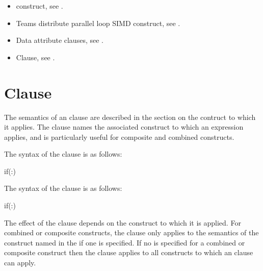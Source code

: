 \crossreferences
\begin{itemize}
\item {} construct, see .

\item Teams distribute parallel loop SIMD construct, see 
      .

\item Data attribute clauses, see 
      .

\item {} Clause, see .

\end{itemize}




\section{ Clause}
\label{sec:if Clause}

\summary
The semantics of an  clause are described in the section on the
contruct to which it applies. 
The  clause  names the associated
construct to which an expression applies, and is particularly useful for 
composite and combined constructs.

\syntax
\ccppspecificstart

The syntax of the  clause is as follows:

\begin{boxedcode}
if(\plc{[ directive-name-modifier }:\plc{] scalar-expression}) 
\end{boxedcode}
\ccppspecificend

\fortranspecificstart

The syntax of the  clause is as follows:

\begin{boxedcode}
if(\plc{[ directive-name-modifier }:\plc{] scalar-logical-expression}) 
\end{boxedcode}
\fortranspecificend

\descr
The effect of the  clause depends on the construct to 
which it is applied. For combined or composite constructs, the
 clause only applies to the semantics of the construct 
named in the  if one is specified. 
If no   is specified for a combined 
or composite construct then the  clause applies to all 
constructs to which an  clause can apply.




